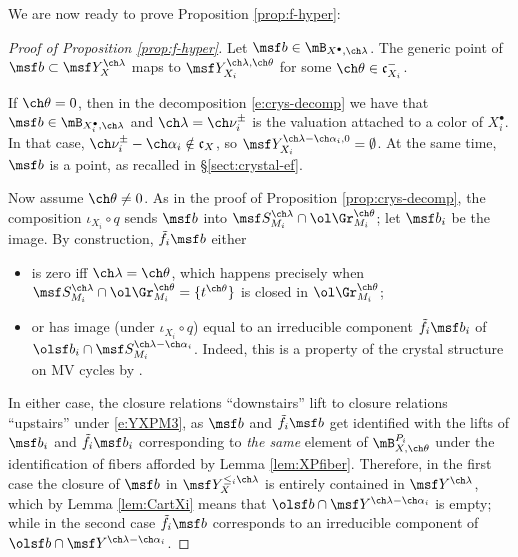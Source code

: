 We are now ready to prove Proposition \ref{prop:f-hyper}:

\begin{proof}[Proof of Proposition \ref{prop:f-hyper}]
Let $\msf b \in \mB_{X^\bullet, \ch\lambda}$.
The generic point of $\msf b \subset \msf Y^{\ch\lambda}_X$ maps to
$\msf Y^{\ch\lambda,\ch\theta}_{X_i}$
for some $\ch\theta \in \mathfrak c_{X_i}^-$.

If $\ch\theta=0$, then in the decomposition \eqref{e:crys-decomp} we have that $\msf b\in \mB_{X_i^\bullet,\ch\lambda}$ and
$\ch\lambda = \ch\nu_i^\pm$ is the valuation attached to a color of $X_i^\bullet$. In that case, $\ch\nu_i^\pm-\ch\alpha_i \notin \mathfrak c_X$,
so  $\msf Y^{\ch\lambda-\ch\alpha_i,0}_{X_i} = \emptyset$. At the same time, $\msf b$ is a point, as recalled in \S \ref{sect:crystal-ef}.

Now assume $\ch\theta \ne 0$. As in the proof of Proposition \ref{prop:crys-decomp}, the composition $\iota_{X_i}\circ q$  sends $\msf b$ into $\msf S_{M_i}^{\ch\lambda}\cap \ol\Gr_{M_i}^{\ch\theta}$; let $\msf b_i$ be the image. By construction, $\tilde f_i \msf b$ either
\begin{itemize}
 \item is zero iff $\ch\lambda = \ch\theta$, which happens precisely when $\msf S_{M_i}^{\ch\lambda}\cap \ol\Gr_{M_i}^{\ch\theta} = \{t^{\ch\theta}\}$ is closed in $\ol\Gr_{M_i}^{\ch\theta}$;
 \item or has image (under $\iota_{X_i}\circ q$) equal to an irreducible component $\tilde f_i \msf b_i$ of $\olsf b_i \cap \msf S_{M_i}^{\ch\lambda-\ch\alpha_i}$. Indeed, this is a property of the crystal structure on MV cycles by \cite{BGcrys}.
\end{itemize}

In either case, the closure relations ``downstairs'' lift to closure relations ``upstairs'' under \eqref{e:YXPM3}, as $\msf b$ and $\tilde f_i\msf b$ get identified with the lifts of $\msf b_i$ and $\tilde f_i\msf b_i$ corresponding to \emph{the same} element of $\mB^{P_i}_{X,\ch\theta}$ under the identification of fibers afforded by Lemma \ref{lem:XPfiber}. Therefore, in the first case the closure of $\msf b$ in $\msf Y^{\le_i \ch\lambda}_{X}$ is entirely contained in $\msf Y^{\ch\lambda}$, which by Lemma \ref{lem:CartXi} means that $\olsf b \cap \msf Y^{\ch\lambda-\ch\alpha_i}$ is empty; while in the second case $\tilde f_i\msf b$ corresponds to an irreducible component of $\olsf b \cap \msf Y^{\ch\lambda-\ch\alpha_i}$.
\end{proof}
